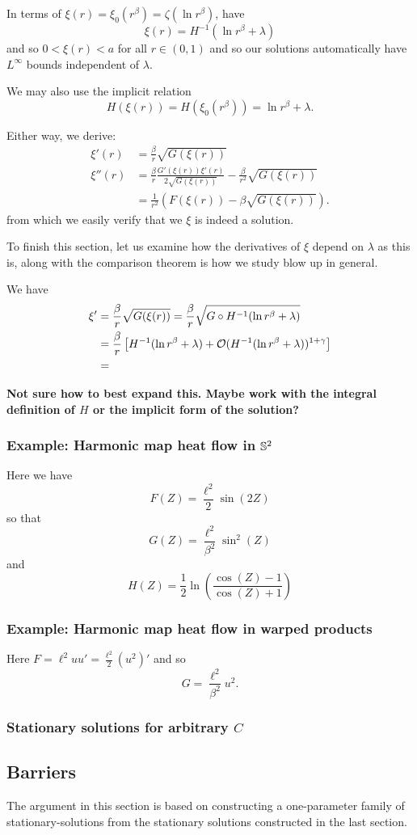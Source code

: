 \documentclass{amsart}
\begin{document}
In terms of \(\xi(r) = \xi_0(r^{\beta}) = \zeta(\ln r^{\beta})\), have
\[
\xi(r) = H^{-1} (\ln r^{\beta} + \lambda)
\]
and so \(0 < \xi(r) < a\) for all \(r \in (0, 1)\) and so our solutions automatically have \(L^{\infty}\) bounds independent of \(\lambda\).

We may also use the implicit relation
\[
H (\xi(r)) = H (\xi_0(r^{\beta})) = \ln r^{\beta} + \lambda.
\]

Either way, we derive:
\begin{align*}
\xi'(r) &= \frac{\beta}{r}  \sqrt{G(\xi(r))} \\
\xi''(r) &= \frac{\beta}{r} \frac{G'(\xi(r)) \xi'(r)}{2 \sqrt{G(\xi(r))}} - \frac{\beta}{r^2} \sqrt{G(\xi(r))} \\
&= \frac{1}{r^2} \left(F(\xi(r))- \beta \sqrt{G(\xi(r))}\right).
\end{align*}
from which we easily verify that we \(\xi\) is indeed a solution.

To finish this section, let us examine how the derivatives of \(\xi\) depend on \(\lambda\) as this is, along with the comparison theorem is how we study blow up in general.

We have
\[
\begin{split}
\xi' &= \frac{\beta}{r}  \sqrt{G(\xi(r))} = \frac{\beta}{r}  \sqrt{G \circ H^{-1}(\ln r^{\beta} + \lambda)} \\
&= \frac{\beta}{r} \left[H^{-1} (\ln r^{\beta} + \lambda)  + \bigo(H^{-1} (\ln r^{\beta} + \lambda))^{1 + \gamma}\right] \\
&= 
\end{split}
\]

\textbf{Not sure how to best expand this. Maybe work with the integral definition of \(H\) or the implicit form of the solution?}

\subsubsection*{Example: Harmonic map heat flow in \(\S^2\)}

Here we have
\[
F(Z) = \frac{\ell^2}{2} \sin(2Z)
\]
so that
\[
G(Z) = \frac{\ell^2}{\beta^2} \sin^2(Z)
\]
and
\[
H(Z) = \frac{1}{2} \ln \left(\frac{\cos(Z) - 1}{\cos(Z) + 1}\right)
\]

\subsubsection*{Example: Harmonic map heat flow in warped products}

Here \(F = \ell^2 uu' = \tfrac{\ell^2}{2} (u^2)'\) and so
\[
G = \frac{\ell^2}{\beta^2} u^2.
\]
\subsubsection*{Stationary solutions for arbitrary \(C\)}
\subsection{Barriers}

The argument in this section is based on constructing a one-parameter family of stationary-solutions from the stationary solutions constructed in the last section.
\end{document}
